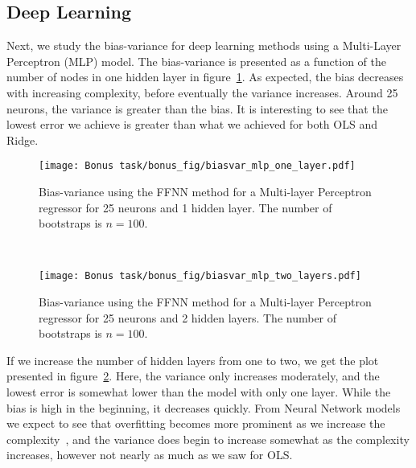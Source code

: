 \documentclass[reprint,english,notitlepage]{revtex4-1}  %
\begin{document}
\subsection*{Deep Learning} %
Next, we study the bias-variance for deep learning methods using a Multi-Layer Perceptron (MLP) model. The bias-variance is presented as a function of the number of nodes in one hidden layer in figure~\ref{fig: MLP}. 
As expected, the bias decreases with increasing complexity, before eventually the variance increases. Around 25 neurons, the variance is greater than the bias. It is interesting to see that the lowest error we achieve is greater than what we achieved for both OLS and Ridge. 
\begin{figure}[h!]
    \centering %
    \texttt{[image: Bonus task/bonus\_fig/biasvar\_mlp\_one\_layer.pdf]} 
    \caption{Bias-variance using the FFNN method for a Multi-layer Perceptron regressor for 25 neurons and 1 hidden layer. The number of bootstraps is $n=100$.}
    \label{fig: MLP}
\end{figure}
\vspace{3mm}
\\ 
\begin{figure}[h!]
    \centering %
    \texttt{[image: Bonus task/bonus\_fig/biasvar\_mlp\_two\_layers.pdf]} 
    \caption{Bias-variance using the FFNN method for a Multi-layer Perceptron regressor for 25 neurons and 2 hidden layers. The number of bootstraps is $n=100$.}
    \label{fig: MLP_two}
\end{figure}
If we increase the number of hidden layers from one to two, we get the plot presented in figure~\ref{fig: MLP_two}. Here, the variance only increases moderately, and the lowest error is somewhat lower than the model with only one layer. While the bias is high in the beginning, it decreases quickly. 
From Neural Network models we expect to see that overfitting becomes more prominent as we increase the complexity~\cite{friedman}, and the variance does begin to increase somewhat as the complexity increases, however not nearly as much as we saw for OLS. 
\end{document}
